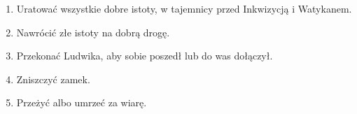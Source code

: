 			{
				\begin{enumerate}[noitemsep]
					\item Uratować wszystkie dobre istoty, w tajemnicy przed Inkwizycją i Watykanem.
					\item Nawrócić złe istoty na dobrą drogę.
					\item Przekonać Ludwika, aby sobie poszedł lub do was dołączył.
					\item Zniszczyć zamek.
					\item Przeżyć albo umrzeć za wiarę.
				\end{enumerate}

			}{
			}
			{}
			{}
			
